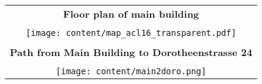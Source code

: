 

\thispagestyle{empty}

\begin{center}
  \begin{tabular}{c}
    \textbf{Floor plan of main building}\\ \\
    \texttt{[image: content/map\_acl16\_transparent.pdf]} \\ \hline \\
    \textbf{Path from Main Building to Dorotheenstrasse 24}\\ \\ 
    \texttt{[image: content/main2doro.png]}
  \end{tabular}
\end{center}
